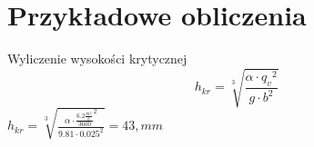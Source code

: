 \section{Przykładowe obliczenia}

\begin{flushleft}
    Wyliczenie wysokości krytycznej
    \begin{equation}
        h_{kr}=\sqrt[3]{\frac{\alpha \cdot {q_v}^2}{g\cdot b^2}} 
    \end{equation}
    \centering
    $ h_{kr}=\sqrt[3]{\frac{\alpha \cdot {\frac{6.2\frac{m^3}{h}}{3600}}^2}{9.81\cdot 0.025^2}}=43,mm$
\end{flushleft} 

    

